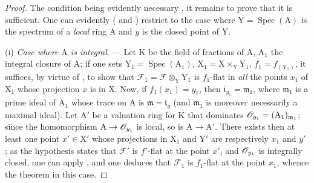 \begin{proof}
The condition being evidently necessary , it remains to prove that it is sufficient.
One can evidently ( and ) restrict to the case where $\mathrm{Y}=\operatorname{Spec}(\mathrm{A})$ is the spectrum of a \emph{local} ring $\mathrm{A}$ and $y$ is the closed point of $\mathrm{Y}$.
\medskip

(i) \emph{Case where $\mathrm{A}$ is integral.} --- Let $\mathrm{K}$ be the field of fractions of $\mathrm{A}$, $\mathrm{A}_1$ the integral closure of $\mathrm{A}$; if one sets $\mathrm{Y}_1=\operatorname{Spec}(\mathrm{A}_1)$, $\mathrm{X}_1=\mathrm{X}\times_\mathrm{Y}\mathrm{Y}_1$, $f_1=f_{(\mathrm{Y}_1)}$, it suffices, by virtue of , to show that $\mathscr{F}_1=\mathscr{F}\otimes_\mathrm{Y}\mathrm{Y}_1$ is $f_1$-flat in \emph{all} the points $x_1$ of $\mathrm{X}_1$ whose projection $x$ is in $\mathrm{X}$.
Now, if $f_1(x_1)=y_1$, then $\mathfrak{i}_{y_1}=\mathfrak{m}_1$, where $\mathfrak{m}_1$ is a prime ideal of $\mathrm{A}_1$ whose trace on $\mathrm{A}$ is $\mathfrak{m}=\mathfrak{i}_y$ (and $\mathfrak{m}_1$ is moreover necessarily a maximal ideal). Let $\mathrm{A}'$ be a valuation ring for $\mathrm{K}$ that dominates $\mathscr{O}_{y_1}=(\mathrm{A}_1)_{\mathfrak{m}_1}$; since the homomorphism $\mathrm{A}\to\mathscr{O}_{y_1}$ is local, so is $\mathrm{A}\to\mathrm{A}'$.
There exists then at least one
point $x'\in\mathrm{X}'$ whose projections in $\mathrm{X}_1$ and $\mathrm{Y}'$ are respectively $x_1$ and $y'$ ; as the hypothesis states that $\mathscr{F}'$ is $f'$-flat at the point $x'$, and $\mathscr{O}_{y_1}$ is integrally closed, one can apply , and one deduces that $\mathscr{F}_1$ is $f_1$-flat at the point $x_1$, whence the theorem in this case.
\medskip


\end{proof}
